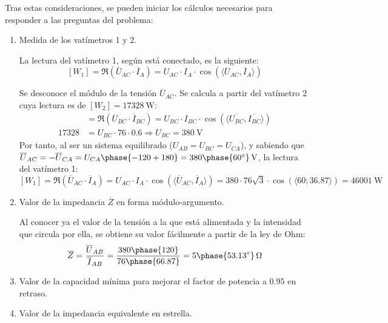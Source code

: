 Tras estas consideraciones, se pueden iniciar los cálculos necesarios
para responder a las preguntas del problema:
\begin{enumerate}
\item Medida de los vatímetros 1 y 2.
    
  La lectura del vatímetro 1, según está conectado, es la siguiente:
  \[ [W_1]=\Re(\overline{U}_{AC}\cdot \overline{I} _A)=U_{AC}\cdot I_A\cdot
    \cos(\langle \overline{U}_{AC}, \overline{I}_A \rangle)
  \]

  Se desconoce el módulo de la tensión $\overline{U}_{AC}$. Se calcula
  a partir del vatímetro 2 cuya lectura es de
  $[W_2]=\qty{17328}{\watt}$:
  \begin{align*}
 [W_2] &=\Re(\overline{U}_{BC} \cdot \overline{I}_{BC})=U_{BC}\cdot
    I_{BC}\cdot \cos(\langle \overline{U_{BC}},
         \overline{I_{BC}}\rangle)\\
    17328&=U_{BC}\cdot 76\cdot
    0.6\Rightarrow U_{BC}=\qty{380}{\volt}
  \end{align*}
  Por tanto, al ser un sistema equilibrado ($U_{AB}=U_{BC}=U_{CA}$), y
  sabiendo que
  $\overline{U}_{AC}=-\overline{U}_{CA}=U_{CA}\phase{-120+180}=\qty[parse-numbers=false]{380\phase{\ang{60}}}{\volt}$,
  la lectura del vatímetro 1:
  \[ [W_1]=\Re(\overline{U}_{AC}\cdot \overline{I}_A)=U_{AC}\cdot I_A\cdot
    \cos(\langle \overline{U}_{AC}, \overline{I}_A \rangle)=380\cdot
    76\sqrt{3}\cdot \cos(\langle60;36.87\rangle)=\qty{46001}{\watt}
  \]

\item Valor de la impedancia $\overline{Z}$ en forma módulo-argumento.

  Al conocer ya el valor de la tensión a la que está alimentada y la
  intensidad que circula por ella, se obtiene su valor fácilmente a
  partir de la ley de Ohm:
  \[
    \overline{Z}=\dfrac{\overline{U}_{AB}}{\overline{I}_{AB}}=\dfrac{380\phase{120}}{76\phase{66.87}}=\qty[parse-numbers=false]{5\phase{\ang{53.13}}}{\ohm}
  \]

\item Valor de la capacidad mínima para mejorar el factor de potencia
  a $0.95$ en retraso.




\item Valor de la impedancia equivalente en estrella.


\end{enumerate}

\section{}

\subsection{}


